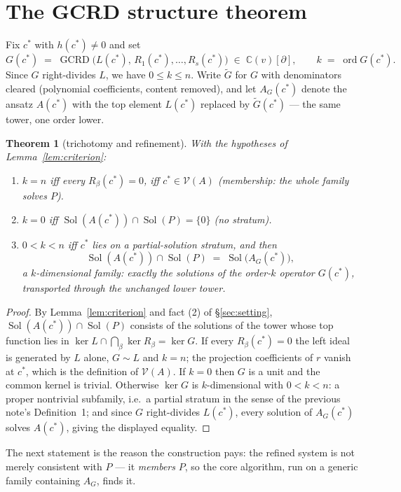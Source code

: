 \documentclass[11pt]{article}
\newcommand{\Var}{\mathcal{V}}
\DeclareMathOperator{\Sol}{Sol}
\DeclareMathOperator{\GCRD}{GCRD}
\DeclareMathOperator{\ord}{ord}
\newtheorem{theorem}{Theorem}
\begin{document}
\section{The GCRD structure theorem}

Fix $c^*$ with $h(c^*) \neq 0$ and set
\[
G(c^*) \;=\; \GCRD\big(L(c^*),\, R_1(c^*), \dots, R_s(c^*)\big)
\;\in\; \mathbb{C}(v)[\partial],
\qquad k \;=\; \ord G(c^*) .
\]
Since $G$ right-divides $L$, we have $0 \le k \le n$. Write
$\widetilde{G}$ for $G$ with denominators cleared (polynomial coefficients,
content removed), and let $A_G(c^*)$ denote the ansatz $A(c^*)$ with the top
element $L(c^*)$ replaced by $\widetilde{G}(c^*)$ --- the same tower, one
order lower.

\begin{theorem}[trichotomy and refinement]
\label{thm:structure}
With the hypotheses of Lemma~\ref{lem:criterion}:
\begin{enumerate}
\item $k = n$ iff every $R_\beta(c^*) = 0$, iff $c^* \in \Var(A)$
      (membership: the whole family solves $P$).
\item $k = 0$ iff $\Sol(A(c^*)) \cap \Sol(P) = \{0\}$ (no stratum).
\item $0 < k < n$ iff $c^*$ lies on a partial-solution stratum, and then
      \[
      \Sol(A(c^*)) \cap \Sol(P) \;=\; \Sol\big(A_G(c^*)\big),
      \]
      a $k$-dimensional family: exactly the solutions of the order-$k$
      operator $G(c^*)$, transported through the unchanged lower tower.
\end{enumerate}
\end{theorem}

\begin{proof}
By Lemma~\ref{lem:criterion} and fact (2) of \S\ref{sec:setting},
$\Sol(A(c^*)) \cap \Sol(P)$ consists of the solutions of the tower whose top
function lies in $\ker L \cap \bigcap_\beta \ker R_\beta = \ker G$. If every
$R_\beta(c^*) = 0$ the left ideal is generated by $L$ alone, $G \sim L$ and
$k = n$; the projection coefficients of $r$ vanish at $c^*$, which is the
definition of $\Var(A)$. If $k = 0$ then $G$ is a unit and the common kernel
is trivial. Otherwise $\ker G$ is $k$-dimensional with $0 < k < n$: a proper
nontrivial subfamily, i.e.\ a partial stratum in the sense of the previous
note's Definition~1; and since $G$ right-divides $L(c^*)$, every solution of
$A_G(c^*)$ solves $A(c^*)$, giving the displayed equality.
\end{proof}

The next statement is the reason the construction pays: the refined system is
not merely consistent with $P$ --- it \emph{members} $P$, so the core
algorithm, run on a generic family containing $A_G$, finds it.
\end{document}
